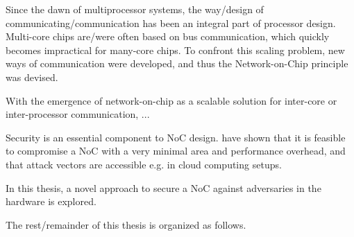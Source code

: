 Since the dawn of multiprocessor systems, the way/design of communicating/communication has been an integral part of processor design.
Multi-core chips are/were often based on bus communication, which quickly becomes impractical for many-core chips.
To confront this scaling problem, new ways of communication were developed, and thus the Network-on-Chip principle was devised.

With the emergence of network-on-chip as a scalable solution for inter-core or inter-processor communication, ...

Security is an essential component to NoC design. \citeauthor{ancajas14fortnocs} have shown that it is feasible to compromise a NoC with a very
minimal area and performance overhead, and that attack vectors are accessible e.g. in cloud computing setups. \cite{ancajas14fortnocs}

In this thesis, a novel approach to secure a NoC against adversaries in the hardware is explored.

The rest/remainder of this thesis is organized as follows.

